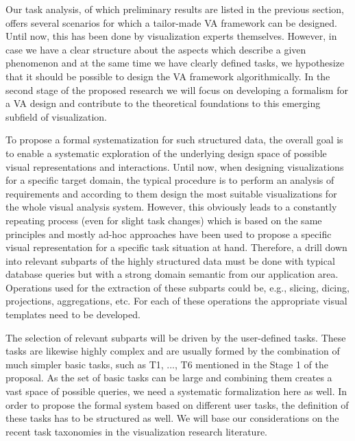 \documentclass[11pt,a4paper,titlepage,oneside,onecolumn]{article}
\begin{document}
Our task analysis, of which preliminary results are listed in the previous section, offers several scenarios for which a tailor-made VA framework can be designed. Until now, this has been done by visualization experts themselves. However, in case we have a clear structure about the aspects which describe a given phenomenon and at the same time we have clearly defined tasks, we hypothesize that it should be possible to design the VA framework algorithmically. In the second stage of the proposed research we will focus on developing a formalism for a VA design and contribute to the theoretical foundations to this emerging subfield of visualization. 

To propose a formal systematization for such structured data, the overall goal is to enable a systematic exploration of the underlying design space of possible visual representations and interactions.
Until now, when designing visualizations for a specific target domain, the typical procedure is to perform an analysis of requirements and according to them design the most suitable visualizations for the whole visual analysis system. 
However, this obviously leads to a constantly repeating process (even for slight task changes) which is based on the same principles and mostly ad-hoc approaches have been used to propose a specific visual representation for a specific task situation at hand.
Therefore, a drill down into relevant subparts of the highly structured data must be done with typical database queries but with a strong domain semantic from our application area. 
Operations used for the extraction of these subparts could be, e.g., slicing, dicing, projections, aggregations, etc. 
For each of these operations the appropriate visual templates need to be developed.

The selection of relevant subparts will be driven by the user-defined tasks.
These tasks are likewise highly complex and are usually formed by the combination of much simpler basic tasks, such as T1, ..., T6 mentioned in the Stage 1 of the proposal. 
As the set of basic tasks can be large and combining them creates a vast space of possible queries, we need a systematic formalization here as well.
In order to propose the formal system based on different user tasks, the definition of these tasks has to be structured as well. We will base our considerations on the recent task taxonomies in the visualization research literature. 
\end{document}
